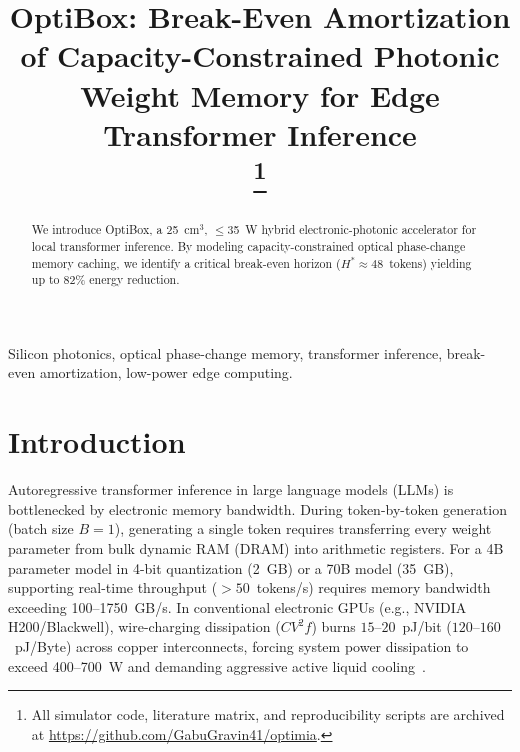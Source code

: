 \documentclass[conference]{IEEEtran}
\begin{document}
\title{OptiBox: Break-Even Amortization of Capacity-Constrained Photonic Weight Memory for Edge Transformer Inference\\
\thanks{All simulator code, literature matrix, and reproducibility scripts are archived at \protect\url{https://github.com/GabuGravin41/optimia}.}
}

\author{
}

\maketitle

\begin{abstract}
We introduce OptiBox, a 25~cm$^3$, $\le$35~W hybrid electronic-photonic accelerator for local transformer inference. By modeling capacity-constrained optical phase-change memory caching, we identify a critical break-even horizon ($H^* \approx 48$~tokens) yielding up to 82\% energy reduction.
\end{abstract}

\begin{IEEEkeywords}
Silicon photonics, optical phase-change memory, transformer inference, break-even amortization, low-power edge computing.
\end{IEEEkeywords}

\section{Introduction}
Autoregressive transformer inference in large language models (LLMs) is bottlenecked by electronic memory bandwidth. During token-by-token generation (batch size $B=1$), generating a single token requires transferring every weight parameter from bulk dynamic RAM (DRAM) into arithmetic registers. For a 4B parameter model in 4-bit quantization (2~GB) or a 70B model (35~GB), supporting real-time throughput ($>50$~tokens/s) requires memory bandwidth exceeding 100--1750~GB/s. In conventional electronic GPUs (e.g., NVIDIA H200/Blackwell), wire-charging dissipation ($CV^2f$) burns $15\text{--}20$~pJ/bit ($120\text{--}160$~pJ/Byte) across copper interconnects, forcing system power dissipation to exceed 400--700~W and demanding aggressive active liquid cooling~\cite{Karimi2026,Meyer2026}.
\end{document}
